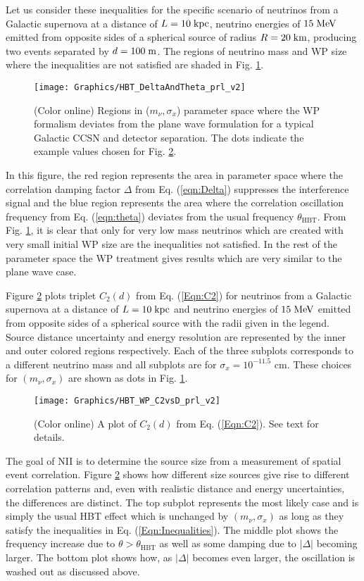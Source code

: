 \documentclass[aps,prl,reprint,floatfix
]{revtex4-1}
\newcommand\picWidthFac{0.75}
\begin{document}
Let us consider these inequalities for the specific scenario of neutrinos from a Galactic supernova at a distance of $L = 10\;{\rm kpc}$, neutrino energies of $15\;{\rm MeV}$ emitted from opposite sides of a spherical source of radius $R=20\;{\rm km}$, producing two events separated by $d=100\;{\rm m}$. The regions of neutrino mass and WP size where the inequalities are not satisfied are shaded in Fig. \ref{fig:Regions}. 
\begin{figure}[ht]
	\texttt{[image: Graphics/HBT\_DeltaAndTheta\_prl\_v2]}
	\caption{(Color online) Regions in ($m_\nu,\sigma_x$) parameter space where the WP formalism deviates from the plane wave formulation for a typical Galactic CCSN and detector separation. The dots indicate the example values chosen for Fig. \ref{fig:C2vsd}.}
	\label{fig:Regions}
\end{figure}
In this figure, the red region represents the area in parameter space where the correlation damping factor $\Delta$ from Eq. (\ref{eqn:Delta}) suppresses the interference signal and the blue region represents the area where the correlation oscillation frequency from Eq. (\ref{eqn:theta}) deviates from the usual frequency $\theta_\text{HBT}$. From Fig. \ref{fig:Regions}, it is clear that only for very low mass neutrinos which are created with very small initial WP size are the inequalities not satisfied. In the rest of the parameter space the WP treatment gives results which are very similar to the plane wave case. 
 
Figure \ref{fig:C2vsd} plots triplet $C_2(d)$ from Eq. (\ref{Eqn:C2}) for neutrinos from a Galactic supernova at a distance of $L = 10\;{\rm kpc}$ and neutrino energies of $15\;{\rm MeV}$ emitted from opposite sides of a spherical source with the radii given in the legend. Source distance uncertainty and energy resolution are represented by the inner and outer colored regions respectively. Each of the three subplots corresponds to a different neutrino mass and all subplots are for $\sigma_x=10^{-11.5}\text{ cm}$. These choices for $\left(m_\nu,\sigma_x\right)$ are shown as dots in Fig. \ref{fig:Regions}.

\begin{figure}[t]
	\texttt{[image: Graphics/HBT\_WP\_C2vsD\_prl\_v2]}
	\caption{(Color online) A plot of $C_2(d)$ from Eq. (\ref{Eqn:C2}). See text for details.}
	\label{fig:C2vsd}
\end{figure}

The goal of NII is to determine the source size from a measurement of spatial event correlation. Figure \ref{fig:C2vsd} shows how different size sources give rise to different correlation patterns and, even with realistic distance and energy uncertainties, the differences are distinct. The top subplot represents the most likely case and is simply the usual HBT effect which is unchanged by $\left(m_\nu,\sigma_x\right)$ as long as they satisfy the inequalities in Eq. (\ref{Eqn:Inequalities}).  The middle plot shows the frequency increase due to $\theta>\theta_\text{HBT}$ as well as some damping due to $\vert\Delta\vert$ becoming larger. The bottom plot shows how, as $\vert\Delta\vert$ becomes even larger, the oscillation is washed out as discussed above.  
\end{document}

